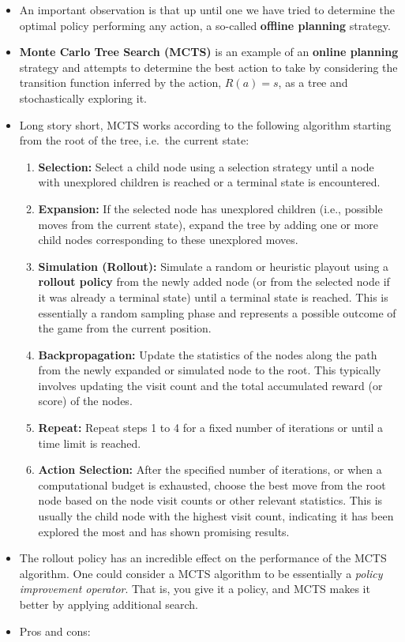 \documentclass[
]{book}
\begin{document}
\begin{itemize}
\item
  An important observation is that up until one we have tried to
  determine the optimal policy performing any action, a so-called
  \textbf{offline planning} strategy.
\item
  \textbf{Monte Carlo Tree Search (MCTS)} is an example of an
  \textbf{online planning} strategy and attempts to determine the best
  action to take by considering the transition function inferred by the
  action, \(R(a) = s\), as a tree and stochastically exploring it.
\item
  Long story short, MCTS works according to the following algorithm
  starting from the root of the tree, i.e.~the current state:

  \begin{enumerate}
  \def\labelenumi{\arabic{enumi}.}
  \item
    \textbf{Selection:} Select a child node using a selection strategy
    until a node with unexplored children is reached or a terminal state
    is encountered.
  \item
    \textbf{Expansion:} If the selected node has unexplored children
    (i.e., possible moves from the current state), expand the tree by
    adding one or more child nodes corresponding to these unexplored
    moves.
  \item
    \textbf{Simulation (Rollout):} Simulate a random or heuristic
    playout using a \textbf{rollout policy} from the newly added node
    (or from the selected node if it was already a terminal state) until
    a terminal state is reached. This is essentially a random sampling
    phase and represents a possible outcome of the game from the current
    position.
  \item
    \textbf{Backpropagation:} Update the statistics of the nodes along
    the path from the newly expanded or simulated node to the root. This
    typically involves updating the visit count and the total
    accumulated reward (or score) of the nodes.
  \item
    \textbf{Repeat:} Repeat steps 1 to 4 for a fixed number of
    iterations or until a time limit is reached.
  \item
    \textbf{Action Selection:} After the specified number of iterations,
    or when a computational budget is exhausted, choose the best move
    from the root node based on the node visit counts or other relevant
    statistics. This is usually the child node with the highest visit
    count, indicating it has been explored the most and has shown
    promising results.
  \end{enumerate}
\item
  The rollout policy has an incredible effect on the performance of the
  MCTS algorithm. One could consider a MCTS algorithm to be essentially
  a \emph{policy improvement operator}. That is, you give it a policy,
  and MCTS makes it better by applying additional search.
\item
  Pros and cons:


\end{itemize}
\end{document}
